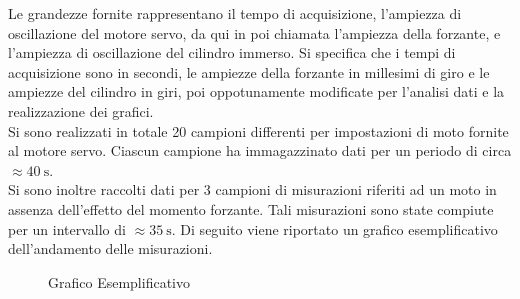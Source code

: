 \documentclass[a4paper,11pt,oneside]{article}
\begin{document}
\begin{table}[h!]
    \centering
    \caption{Corrispondenza Campione-Frequenza}
    \label{tab:corrispondenza_campione_frequenza}
\end{table}

\newpage
Le grandezze fornite rappresentano il tempo di acquisizione, l'ampiezza di oscillazione del motore servo, da qui in poi chiamata l'ampiezza della forzante, e l'ampiezza di oscillazione del cilindro immerso. Si specifica che i tempi di acquisizione sono in secondi, le ampiezze della forzante in millesimi di giro e le ampiezze del cilindro in giri, poi oppotunamente modificate per l'analisi dati e la realizzazione dei grafici.\\
Si sono realizzati in totale 20 campioni differenti per impostazioni di moto fornite al  motore servo. Ciascun campione ha immagazzinato dati per un periodo di circa $\approx \SI{40}{\second}$.\\
Si sono inoltre raccolti dati per 3 campioni di misurazioni riferiti ad un moto in assenza dell'effetto del momento forzante. Tali misurazioni sono state compiute per un intervallo di $\approx  \SI{35}{\second}$.
Di seguito viene riportato un grafico esemplificativo dell'andamento delle misurazioni.




\begin{figure}[h!]
    \centering
    \label{fig:grafico_esempio}
    \caption{Grafico Esemplificativo}
\end{figure}
\end{document}
